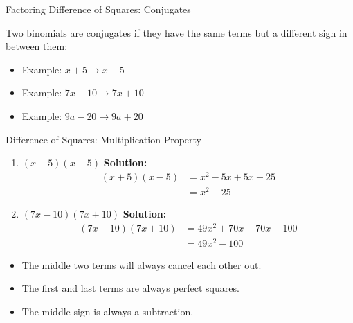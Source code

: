 \documentclass[aspectratio=169]{beamer}
\begin{document}
\begin{frame}{Factoring Difference of Squares: Conjugates}
    \begin{tcolorbox}[colback=lightgray,colframe=primary,title=Conjugates]
        \footnotesize
        Two binomials are conjugates if they have the same terms but a different sign in between them:
        \begin{itemize}
            \item Example: $x + 5 \rightarrow x - 5$
            \item Example: $7x - 10 \rightarrow 7x + 10$
            \item Example: $9a - 20 \rightarrow 9a + 20$
        \end{itemize}
    \end{tcolorbox}
\end{frame}

\begin{frame}{Difference of Squares: Multiplication Property}
    \begin{tcolorbox}[colback=lightgray,colframe=primary,title=What happens when you multiply a binomial with its conjugate?]
        \footnotesize
        \begin{enumerate}
            \item $(x + 5)(x - 5)$
            \quad \textbf{Solution:}
            \begin{align*}
                (x + 5)(x - 5) &= x^2 - 5x + 5x - 25 \\
                &= x^2 - 25
            \end{align*}
            \item $(7x - 10)(7x + 10)$
            \quad \textbf{Solution:}
            \begin{align*}
                (7x - 10)(7x + 10) &= 49x^2 + 70x - 70x - 100 \\
                &= 49x^2 - 100
            \end{align*}
        \end{enumerate}
        \vspace{0.5em}
        \begin{itemize}
            \item The middle two terms will always cancel each other out.
            \item The first and last terms are always perfect squares.
            \item The middle sign is always a subtraction.
        \end{itemize}
    \end{tcolorbox}
\end{frame}
\end{document}
